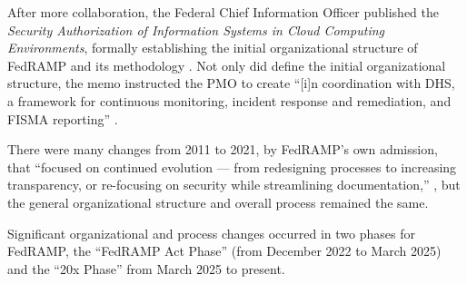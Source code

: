 \documentclass{jdf}
\begin{document}
After more collaboration, the Federal Chief Information Officer published the \textit{Security Authorization of Information Systems in Cloud Computing Environments}, formally establishing the initial organizational structure of FedRAMP and its methodology \cite[p.~241]{metheny17}. Not only did define the initial organizational structure, the memo instructed the PMO to create ``[i]n coordination with DHS, a framework for continuous monitoring, incident response and remediation, and FISMA reporting'' \citeyear[p.~3]{secauthmemo11}.

There were many changes from 2011 to 2021, by FedRAMP's own admission, that ``focused on continued evolution — from redesigning processes to increasing transparency, or re-focusing on security while streamlining documentation,'' \citeyear{fedramp_blog_retrospective21}, but the general organizational structure and overall process remained the same.

Significant organizational and process changes occurred in two phases for FedRAMP, the ``FedRAMP Act Phase'' (from December 2022 to March 2025) and the ``20x Phase'' from March 2025 to present.
\end{document}
